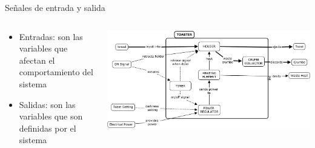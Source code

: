 \documentclass[aspectratio=169]{beamer}
\begin{document}
\begin{frame}{Señales de entrada y salida}
    \begin{columns}[onlytextwidth]
        \begin{column}{0.5\textwidth}
             \begin{itemize}
                \item Entradas: son las variables que afectan el comportamiento del sistema
                \item Salidas: son las variables que son definidas por el sistema
             \end{itemize}
        \end{column}
        \begin{column}{0.5\textwidth}
            \begin{center}
               \includegraphics[width=\textwidth]{fig/tostadora.jpg}
            \end{center}
        \end{column}
    \end{columns}
\end{frame}
\end{document}
